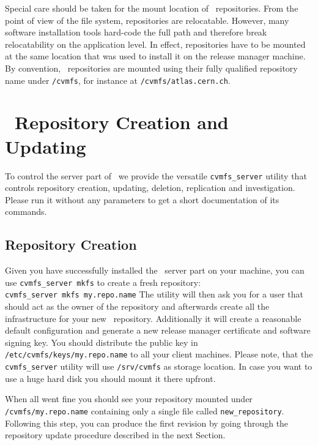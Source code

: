 Special care should be taken for the mount location of \cvmfs\ repositories.
From the point of view of the file system, repositories are relocatable.
However, many software installation tools hard-code the full path and therefore break relocatability on the application level.
In effect, repositories have to be mounted at the same location that was used to install it on the release manager machine.
By convention, \cvmfs\ repositories are mounted using their fully qualified repository name under \texttt{/cvmfs}, for instance at \texttt{/cvmfs/atlas.cern.ch}.

\section{\cvmfs\ Repository Creation and Updating}
\label{sct:repocreateandupdate}
To control the server part of \cvmfs\ we provide the versatile \texttt{cvmfs\_server} utility that controls repository creation, updating, deletion, replication and investigation.
Please run it without any parameters to get a short documentation of its commands.

\subsection{Repository Creation}
\label{sct:repocreation}

Given you have successfully installed the \cvmfs\ server part on your machine, you can use \texttt{cvmfs\_server mkfs} to create a fresh repository:\\
\texttt{cvmfs\_server mkfs my.repo.name}
The utility will then ask you for a user that should act as the owner of the repository and afterwards create all the infrastructure for your new \cvmfs\ repository.
Additionally it will create a reasonable default configuration and generate a new release manager certificate and software signing key. You should distribute the public key in \texttt{/etc/cvmfs/keys/my.repo.name} to all your client machines.
Please note, that the \texttt{cvmfs\_server} utility will use \texttt{/srv/cvmfs} as storage location.
In case you want to use a huge hard disk you should mount it there upfront.

When all went fine you should see your repository mounted under \texttt{/cvmfs/my.repo.name} containing only a single file called \texttt{new\_repository}.
Following this step, you can produce the first revision by going through the repository update procedure described in the next Section.

